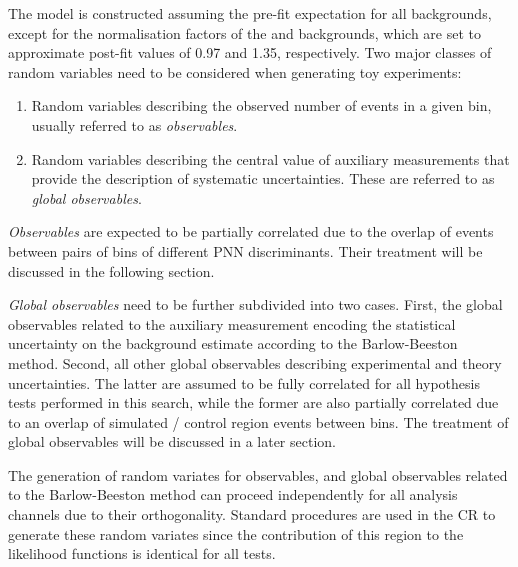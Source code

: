 The model is constructed assuming the pre-fit expectation for all backgrounds,
except for the normalisation factors of the \ttbar and \ZHF backgrounds, which
are set to approximate post-fit values of 0.97 and 1.35, respectively. Two major
classes of random variables need to be considered when generating toy
experiments:
\begin{enumerate}
\item Random variables describing the observed number of events in a given bin,
  usually referred to as \emph{observables}.

\item Random variables describing the central value of auxiliary measurements
  that provide the description of systematic uncertainties. These are referred
  to as \emph{global observables}.
\end{enumerate}

\emph{Observables} are expected to be partially correlated due to the overlap of
events between pairs of bins of different PNN discriminants. Their treatment
will be discussed in the following section.

\emph{Global observables} need to be further subdivided into two cases. First,
the global observables related to the auxiliary measurement encoding the
statistical uncertainty on the background
estimate %
according to the Barlow-Beeston method. Second, all other global observables
describing experimental and theory uncertainties. The latter are assumed to be
fully correlated for all hypothesis tests performed in this search, while the
former are also partially correlated due to an overlap of simulated / control
region events between bins. The treatment of global observables will be
discussed in a later section.

The generation of random variates for observables, and global observables
related to the Barlow-Beeston method can proceed independently for all analysis
channels due to their orthogonality. Standard procedures are used in the CR to
generate these random variates since the contribution of this region to the
likelihood functions is identical for all tests.


%
%
%

